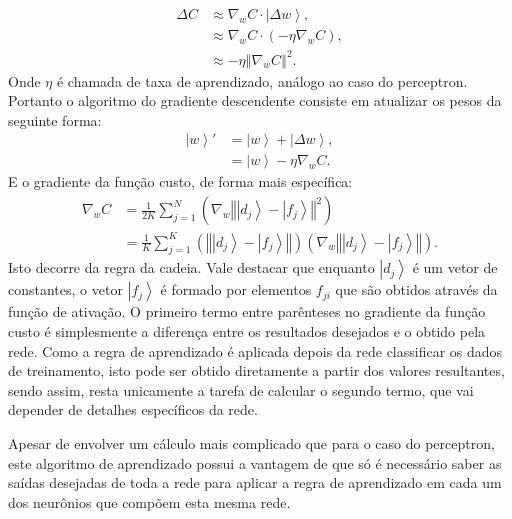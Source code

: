 \begin{equation}
\begin{split}
\Delta C & \approx\nabla_{w}C\cdot\left|\Delta w\right\rangle, \\
& \approx \nabla_{w}C\cdot\left(-\eta\nabla_{w}C\right), \\
 & \approx -\eta\left\Vert \nabla_{w}C\right\Vert ^{2}.
\end{split} 
\end{equation}
Onde $\eta$  é chamada de taxa de aprendizado, análogo ao caso do perceptron. Portanto o algoritmo do gradiente descendente consiste em atualizar os pesos da seguinte forma:
\begin{equation}
\begin{split}
\left|w\right\rangle ' & =\left|w\right\rangle +\left|\Delta w\right\rangle, \\
& =\left|w\right\rangle -\eta\nabla_{w}C.
\end{split}  
\end{equation}
E o gradiente da função custo, de forma mais específica:
\begin{equation}
\begin{split}
\nabla_{w}C & =\frac{1}{2K}\sum_{j=1}^{N}\left(\nabla_{w}\left\Vert \left|d_{j}\right\rangle -\left|f_{j}\right\rangle \right\Vert ^{2}\right) \\
 & =\frac{1}{K}\sum_{j=1}^{K}\left(\left\Vert \left|d_{j}\right\rangle -\left|f_{j}\right\rangle \right\Vert \right)\left(\nabla_{w}\left\Vert \left|d_{j}\right\rangle -\left|f_{j}\right\rangle \right\Vert \right) .
 \end{split}  
 \end{equation}
Isto decorre da regra da cadeia. Vale destacar que enquanto $\left|d_{j}\right\rangle $ é um vetor de constantes, o vetor $\left|f_{j}\right\rangle $ é formado por elementos $f_{ji}$  que são obtidos através da função de ativação. O primeiro termo entre parênteses no gradiente da função custo é simplesmente a diferença entre os resultados desejados e o obtido pela rede. Como a regra de aprendizado é aplicada depois da rede classificar os dados de treinamento, isto pode ser obtido diretamente a partir dos valores resultantes, sendo assim, resta unicamente a tarefa de calcular o segundo termo, que vai depender de detalhes específicos da rede.

Apesar de envolver um cálculo mais complicado que para o caso do perceptron, este algoritmo de aprendizado possui a vantagem de que só é necessário  saber as saídas desejadas de toda a rede para aplicar a regra de aprendizado em cada um dos neurônios que compõem esta mesma rede.

